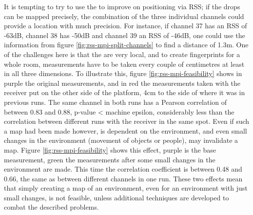 It is tempting to try to use the \mpids to improve on positioning via RSS; if the drops can be mapped precisely, the combination of the three individual channels could provide a location with much precision.
For instance, if channel 37 has an RSS of -63dB, channel 38 has -50dB and channel 39 an RSS of -46dB, one could use the information from figure \ref{fig:rss-mpi-split-channels} to find a distance of 1.3m.
One of the challenges here is that the \mpids are very local, and to create fingerprints for a whole room, measurements have to be taken every couple of centimetres at least in all three dimensions.
To illustrate this, figure \ref{fig:rss-mpi-feasibility} shows in purple the original measurements, and in red the measurements taken with the receiver put on the other side of the platform, 4cm to the side of where it was in previous runs.
The same channel in both runs has a Pearson correlation of between 0.83 and 0.88, p-value < machine epsilon, considerably less than the correlation between different runs with the receiver in the same spot.
Even if such a map had been made however, \mpi is dependent on the environment, and even small changes in the environment (movement of objects or people), may invalidate a map.
Figure \ref{fig:rss-mpi-feasibility} shows this effect, purple is the base measurement, green the measurements after some small changes in the environment are made.
This time the correlation coefficient is between 0.48 and 0.66, the same as between different channels in one run.
These two effects mean that simply creating a map of an environment, even for an environment with just small changes, is not feasible, unless additional techniques are developed to combat the described problems.


